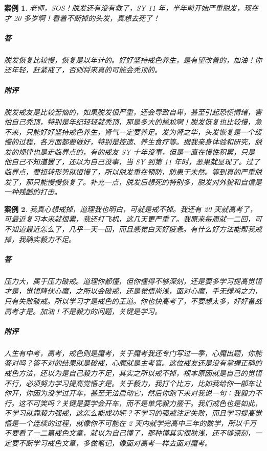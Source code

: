 \documentclass[fontset=founder]{ctexart}
\newtheorem{case}{案例}
\begin{document}
\begin{case}
    老师，SOS！脱发还有没有救了，SY 11 年，半年前开始严重脱发，现在才 20 多岁啊！看着不断掉的头发，真想去死了！
    \subparagraph{答} 脱发恢复比较慢，恢复是以年计的。好好坚持戒色养生，是有望改善的，加油！你还年轻，赶紧戒了，否则将来真的可能会秃顶的。
    \subparagraph{附评} 脱发戒友是比较苦恼的，如果脱发很严重，还会导致自卑，甚至引起恐慌情绪，害怕自己秃顶，特别是年纪轻轻就秃顶，那是多大的尴尬啊！脱发恢复也比较慢，急不来，只能好好坚持戒色养生，肾气一定要养足。发为肾之华，头发恢复是一个缓慢的过程，各方面都要做好，特别是控遗、养生食疗等。据我亲身体验和研究，脱发的规律也是走临界点的，有的戒友 SY 十年没事，但是一直在慢性积累，只是他自己不知道罢了，还以为自己没事，当 SY 到第 11 年时，恶果就显现了。过了临界点，要扭转形势就很慢了，所以脱发重在预防，防患于未然。等到真的严重脱发了，那只能慢慢恢复了。补充一点，脱发后想死的特别多，脱发对外貌和自信是一种残酷的打击。
\end{case}

\begin{case}
    我真心想戒掉，道理我也明白，可就是戒不掉。我还有 20 天就高考了，可最近复习本来就很累，我还打飞机，这几天更严重了。我原来每周就一二回，可不知道最近怎么了，几乎一天一回，而且感觉白天好疲惫。有什么好方法能帮我戒掉，我确实毅力不足。
    \subparagraph{答} 压力大，属于压力破戒。道理你都懂，但你懂得不够深刻，还是要多学习提高觉悟才是，觉悟降伏心魔，之所以会破戒，还是觉悟尚浅，面对心魔，手无缚鸡之力，只有失败破戒。所以学习才是戒色的王道。你也快高考了，不要想太多，好好备战高考才是。加油！不是毅力的问题，关键是学习。
    \subparagraph{附评} 人生有中考，高考，戒色则是魔考，关于魔考我还专门写过一季，心魔出题，你能答对吗？答不对的结果就是破戒，心魔就是主考官。这位戒友还是没有掌握正确的戒色方法，还以为是自己毅力不足，其实之所以戒不掉，根本原因就是自己的觉悟不行，必须努力学习提高觉悟才是。关于毅力，我打个比方，比如我给你一部车让你开，你因为没学过开车，甚至无法启动它，然后你跑下来对我说一句：我毅力不行。这不可笑吗？关键是要学会开车，而不是单凭毅力蛮干。我们戒色也是如此，不学习就靠毅力强戒，这怎么能成功呢？不学习的强戒注定失败，而且学习提高觉悟是一个连续的过程，就像你不可能在 2 天内就学完高中三年的数学，所以千万不要看了一二篇戒色文章，就以为自己懂了，那种懂其实很肤浅，还不够深刻，一定要不断学习戒色文章，多做笔记，像面对高考一样去面对魔考。
\end{case}
\end{document}
